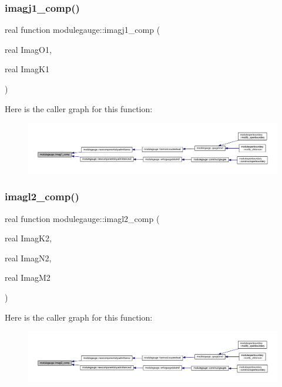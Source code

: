 \subsubsection{\texorpdfstring{imagj1\+\_\+comp()}{imagj1\_comp()}}
{\footnotesize\ttfamily real function modulegauge\+::imagj1\+\_\+comp (\begin{DoxyParamCaption}\item[{real}]{Imag\+O1,  }\item[{real}]{Imag\+K1 }\end{DoxyParamCaption})\hspace{0.3cm}{\ttfamily [private]}}

Here is the caller graph for this function\+:\nopagebreak
\begin{figure}[H]
\begin{center}
\leavevmode
\includegraphics[width=350pt]{namespacemodulegauge_af198ff90d25c103ae0c6ea8dc688ac4f_icgraph}
\end{center}
\end{figure}
\mbox{\label{namespacemodulegauge_aed10e532f405cfa750b753e960e5a8dc}} 
\subsubsection{\texorpdfstring{imagl2\+\_\+comp()}{imagl2\_comp()}}
{\footnotesize\ttfamily real function modulegauge\+::imagl2\+\_\+comp (\begin{DoxyParamCaption}\item[{real}]{Imag\+K2,  }\item[{real}]{Imag\+N2,  }\item[{real}]{Imag\+M2 }\end{DoxyParamCaption})\hspace{0.3cm}{\ttfamily [private]}}

Here is the caller graph for this function\+:\nopagebreak
\begin{figure}[H]
\begin{center}
\leavevmode
\includegraphics[width=350pt]{namespacemodulegauge_aed10e532f405cfa750b753e960e5a8dc_icgraph}
\end{center}
\end{figure}
\mbox{\label{namespacemodulegauge_a0f06a83482f5b7e22cfbc40e9f7e89f4}} 
